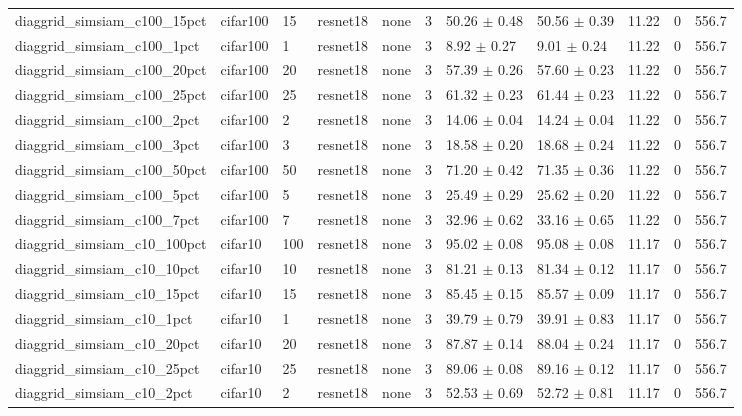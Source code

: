 \begin{tabular}{lllllllllll}
diaggrid_simsiam_c100_15pct & cifar100 & 15 & resnet18 & none & 3 & 50.26 $\pm$ 0.48 & 50.56 $\pm$ 0.39 & 11.22 & 0 & 556.7 \\
diaggrid_simsiam_c100_1pct & cifar100 & 1 & resnet18 & none & 3 & 8.92 $\pm$ 0.27 & 9.01 $\pm$ 0.24 & 11.22 & 0 & 556.7 \\
diaggrid_simsiam_c100_20pct & cifar100 & 20 & resnet18 & none & 3 & 57.39 $\pm$ 0.26 & 57.60 $\pm$ 0.23 & 11.22 & 0 & 556.7 \\
diaggrid_simsiam_c100_25pct & cifar100 & 25 & resnet18 & none & 3 & 61.32 $\pm$ 0.23 & 61.44 $\pm$ 0.23 & 11.22 & 0 & 556.7 \\
diaggrid_simsiam_c100_2pct & cifar100 & 2 & resnet18 & none & 3 & 14.06 $\pm$ 0.04 & 14.24 $\pm$ 0.04 & 11.22 & 0 & 556.7 \\
diaggrid_simsiam_c100_3pct & cifar100 & 3 & resnet18 & none & 3 & 18.58 $\pm$ 0.20 & 18.68 $\pm$ 0.24 & 11.22 & 0 & 556.7 \\
diaggrid_simsiam_c100_50pct & cifar100 & 50 & resnet18 & none & 3 & 71.20 $\pm$ 0.42 & 71.35 $\pm$ 0.36 & 11.22 & 0 & 556.7 \\
diaggrid_simsiam_c100_5pct & cifar100 & 5 & resnet18 & none & 3 & 25.49 $\pm$ 0.29 & 25.62 $\pm$ 0.20 & 11.22 & 0 & 556.7 \\
diaggrid_simsiam_c100_7pct & cifar100 & 7 & resnet18 & none & 3 & 32.96 $\pm$ 0.62 & 33.16 $\pm$ 0.65 & 11.22 & 0 & 556.7 \\
diaggrid_simsiam_c10_100pct & cifar10 & 100 & resnet18 & none & 3 & 95.02 $\pm$ 0.08 & 95.08 $\pm$ 0.08 & 11.17 & 0 & 556.7 \\
diaggrid_simsiam_c10_10pct & cifar10 & 10 & resnet18 & none & 3 & 81.21 $\pm$ 0.13 & 81.34 $\pm$ 0.12 & 11.17 & 0 & 556.7 \\
diaggrid_simsiam_c10_15pct & cifar10 & 15 & resnet18 & none & 3 & 85.45 $\pm$ 0.15 & 85.57 $\pm$ 0.09 & 11.17 & 0 & 556.7 \\
diaggrid_simsiam_c10_1pct & cifar10 & 1 & resnet18 & none & 3 & 39.79 $\pm$ 0.79 & 39.91 $\pm$ 0.83 & 11.17 & 0 & 556.7 \\
diaggrid_simsiam_c10_20pct & cifar10 & 20 & resnet18 & none & 3 & 87.87 $\pm$ 0.14 & 88.04 $\pm$ 0.24 & 11.17 & 0 & 556.7 \\
diaggrid_simsiam_c10_25pct & cifar10 & 25 & resnet18 & none & 3 & 89.06 $\pm$ 0.08 & 89.16 $\pm$ 0.12 & 11.17 & 0 & 556.7 \\
diaggrid_simsiam_c10_2pct & cifar10 & 2 & resnet18 & none & 3 & 52.53 $\pm$ 0.69 & 52.72 $\pm$ 0.81 & 11.17 & 0 & 556.7 \\

\end{tabular}

